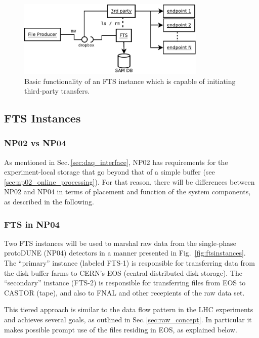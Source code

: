 \documentclass[pdftex,12pt,letter]{article}
\begin{document}
\begin{figure}[tbh]
  \centering
  \includegraphics[width=0.8\textwidth]{fts-basics-3rd.pdf}
  \caption{Basic functionality of an FTS instance which is capable of initiating third-party transfers.}
  \label{fig:ftsbasicsthird}
\end{figure}



\subsection{FTS Instances}
\label{sec:instances}
\subsubsection{NP02 vs NP04}
As mentioned in Sec.\,\ref{sec:daq_interface}, NP02 has requirements for the experiment-local storage that go beyond
that of a simple buffer (see\,\ref{sec:np02_online_processing}). For that reason, there will be differences between NP02 and NP04 in terms of placement and
function of the system components, as described in the following.

\subsubsection{FTS in NP04}
\label{sec:prim_sec}
Two FTS instances will be used to marshal raw data from the single-phase protoDUNE (NP04)
detectors in a manner presented in Fig.~\ref{fig:ftsinstances}.  The
``primary'' instance (labeled FTS-1) is responsible for transferring data
from the disk buffer farms to CERN's EOS (central distributed disk storage).
 The ``secondary'' instance (FTS-2) is responsible for transferring files from EOS to
CASTOR (tape), and also to FNAL and other recepients of the raw data set.

This tiered approach is similar to the data flow pattern in the LHC experiments and achieves several goals,
as outlined in Sec.\,\ref{sec:raw_concept}. In particular
it makes possible prompt use of the files residing in EOS, as explained below.
\end{document}
